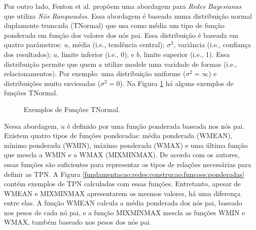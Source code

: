 Por outro lado, Fenton et al. \cite{fenton} propõem uma abordagem para \textit{Redes Bayesianas} que utiliza \textit{Nós Ranqueados}. Essa abordagem é baseada numa distribuição normal duplamente truncada (TNormal) que usa como média um tipo de função ponderada em função dos valores dos nós pai. Essa distribuição é baseada em quatro parâmetros: $u$, média (i.e., tendência central); $\sigma^{2}$, variância (i.e., confiança dos resultados); $a$, limite inferior (i.e., 0); e $b$, limite superior (i.e., 1). Essa distribuição permite que quem a utilize modele uma varidade de formas (i.e., relacionamentos). Por exemplo: uma distribuição uniforme ($\sigma^{2} = \infty$) e distribuições muito enviesadas ($\sigma^{2} = 0$). Na Figura \ref{fundamentacao:redes:construcao:funcoes:tnormal} há alguns exemplos de funções TNormal.

\begin{figure}[ht!]
\begin{center}
	\end{center}
	\caption{Exemplos de Funções TNormal.}
	\label{fundamentacao:redes:construcao:funcoes:tnormal}
\end{figure}

Nessa abordagem, $u$ é definido por uma função ponderada baseada nos nós pai. Existem quatro tipos de funções ponderadas: média ponderada (WMEAN), mínimo ponderada (WMIN), máximo ponderada (WMAX) e uma última função que mescla a WMIN e a WMAX (MIXMINMAX). De acordo com os autores, essas funções são suficientes para representar os tipos de relações necessárias para definir as TPN. A Figura \ref{fundamentacao:redes:construcao:funcoes:ponderadas} contém exemplos de TPN calculadas com essas funções. Entretanto, apesar de WMEAN e MIXMINMAX apresentarem os mesmos valores, há uma diferença entre elas. A função WMEAN calcula a média ponderada dos nós pai, baseado nos pesos de cada nó pai, e a função MIXMINMAX mescla as funções WMIN e WMAX, também baseado nos pesos dos nós pai.

